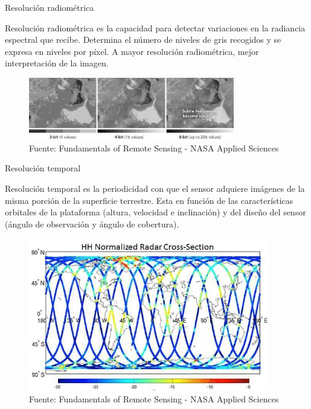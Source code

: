 \begin{frame}{Resolución radiométrica}
  \begin{block}{Resolución radiométrica}
    es la capacidad para detectar variaciones en la radiancia espectral que recibe. Determina el número de niveles de gris recogidos y se expresa en niveles por píxel. A mayor resolución radiométrica, mejor interpretación de la imagen.
  \end{block}

  \begin{figure}
    \begin{center}
      \includegraphics[width=0.80\textwidth]{img/section_03/resolucion_radiometrica}
    \end{center}
    \caption{Fuente: Fundamentals of Remote Sensing - NASA Applied Sciences}
    \label{fig:resolucion_radiometrica}
  \end{figure}
\end{frame}

\begin{frame}{Resolución temporal}
  \begin{block}{Resolución temporal}
    es la periodicidad con que el sensor adquiere imágenes de la misma porción de la superficie terrestre. Esta en función de las características orbitales de la plataforma (altura, velocidad e inclinación) y del diseño del sensor (ángulo de observación y ángulo de cobertura).
  \end{block}

  \begin{figure}
    \begin{center}
      \includegraphics[scale=0.4]{img/section_03/resolucion_temporal}
    \end{center}
    \caption{Fuente: Fundamentals of Remote Sensing - NASA Applied Sciences}
    \label{fig:resolucion_temporal}
  \end{figure}
\end{frame}

